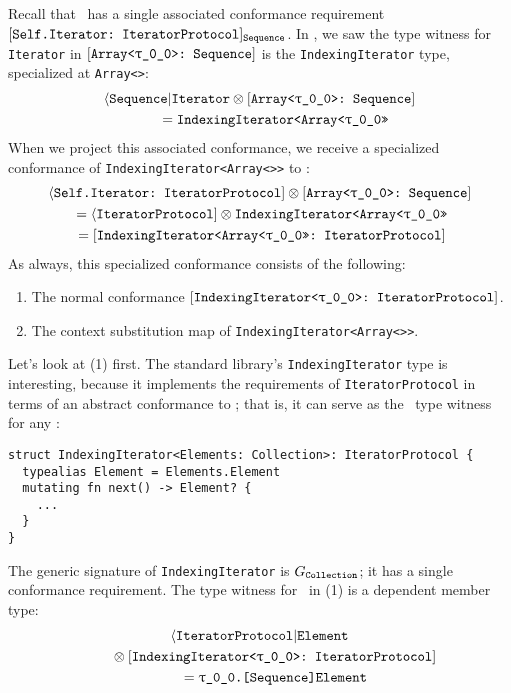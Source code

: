 \documentclass[../generics]{subfiles}
\begin{document}
\begin{example}\label{indexing iterator example}
Recall that \tSequence\ has a single associated conformance requirement $[\texttt{Self.Iterator:~IteratorProtocol}]_{\texttt{Sequence}}$. In , we saw the type witness for \texttt{Iterator} in $\ArraySequence$ is the \texttt{IndexingIterator} type, specialized at \texttt{Array<\rT>}:
\begin{gather*}
\AIterator \otimes \ArraySequence\\
\qquad {} = \texttt{IndexingIterator<Array<\rT>>}
\end{gather*}
When we project this associated conformance, we receive a specialized conformance of \texttt{IndexingIterator<Array<\rT>>} to \tIterator:
\begin{gather*}
\SelfIterator \otimes \ArraySequence\\
{} = \PIterator \otimes \texttt{IndexingIterator<Array<\rT>>}\\
{} = \ConfReq{IndexingIterator<Array<\rT>>}{IteratorProtocol}
\end{gather*}
As always, this specialized conformance consists of the following:
\begin{enumerate}
\item The normal conformance $\ConfReq{IndexingIterator<\rT>}{IteratorProtocol}$.
\item The context substitution map of \texttt{IndexingIterator<Array<\rT>>}.
\end{enumerate}
Let's look at (1) first. The standard library's \texttt{IndexingIterator} type is interesting, because it implements the requirements of \texttt{IteratorProtocol} in terms of an abstract conformance to \tCollection; that is, it can serve as the \nIterator\ type witness for any \tCollection:
\begin{Verbatim}
struct IndexingIterator<Elements: Collection>: IteratorProtocol {
  typealias Element = Elements.Element
  mutating fn next() -> Element? {
    ...
  }
}
\end{Verbatim}
The generic signature of \texttt{IndexingIterator} is $G_{\texttt{Collection}}$; it has a single conformance requirement. The type witness for \nElement\ in (1) is a dependent member type:
\begin{gather*}
\AIElement \\
\qquad {} \otimes \ConfReq{IndexingIterator<\rT>}{IteratorProtocol} \\
\qquad {} = \texttt{\rT.[Sequence]Element}
\end{gather*}

\end{example}
\end{document}
